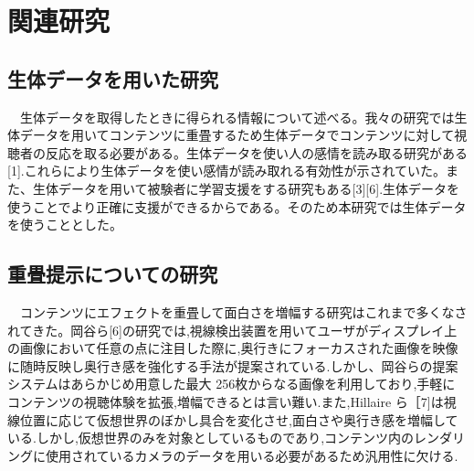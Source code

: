 \thispagestyle{myheadings}
\chapter{関連研究}


\section{生体データを用いた研究}
　生体データを取得したときに得られる情報について述べる。我々の研究では生体データを用いてコンテンツに重畳するため生体データでコンテンツに対して視聴者の反応を取る必要がある。生体データを使い人の感情を読み取る研究がある[1].これらにより生体データを使い感情が読み取れる有効性が示されていた。また、生体データを用いて被験者に学習支援をする研究もある[3][6].生体データを使うことでより正確に支援ができるからである。そのため本研究では生体データを使うこととした。


\section{重畳提示についての研究}
　コンテンツにエフェクトを重畳して面白さを増幅する研究はこれまで多くなされてきた。岡谷ら[6]の研究では,視線検出装置を用いてユーザがディスプレイ上の画像において任意の点に注目した際に,奥行きにフォーカスされた画像を映像に随時反映し奥行き感を強化する手法が提案されている.しかし、岡谷らの提案システムはあらかじめ用意した最大 256枚からなる画像を利用しており,手軽にコンテンツの視聴体験を拡張,増幅できるとは言い難い.また,Hillaire ら［7]は視線位置に応じて仮想世界のぼかし具合を変化させ,面白さや奥行き感を増幅している.しかし,仮想世界のみを対象としているものであり,コンテンツ内のレンダリングに使用されているカメラのデータを用いる必要があるため汎用性に欠ける.


